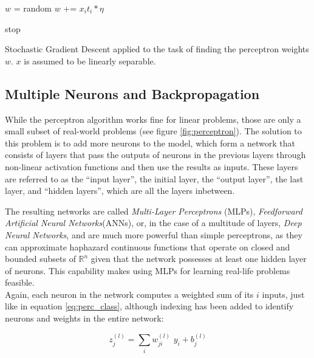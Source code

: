\begin {algorithm}
	\begin {algorithmic}[1]
		\State $w$ = random
					\State $w$ += $x_i t_i * \eta$
				\EndIf

					\State stop
				\EndIf
			\EndFor
		\EndWhile
	\end{algorithmic}
	\caption{Stochastic Gradient Descent applied to the task of finding the perceptron weights $w$. $x$ is assumed to be linearly separable.}
	\label{alg:perceptron_algorithm}
\end{algorithm}



		\subsection{Multiple Neurons and Backpropagation}
While the perceptron algorithm works fine for linear problems, those are only a small subset of real-world problems (see figure \ref{fig:perceptron}). The solution to this problem is to add more neurons to the model, which form a network that consists of layers that pass the outputs of neurons in the previous layers through non-linear activation functions and then use the results as inputs. These layers are referred to as the ``input layer'', the initial layer, the ``output layer'', the last layer, and ``hidden layers'', which are all the layers inbetween.

The resulting networks are called \textit{Multi-Layer Perceptrons} (MLPs), \textit{Feedforward Artificial Neural Networks}(ANNs), or, in the case of a multitude of layers, \textit{Deep Neural Networks}, and are much more powerful than simple perceptrons, as they can approximate haphazard continuous functions that operate on closed and bounded subsets of $\mathbb{R}^n$ given that the network possesses at least one hidden layer of neurons. This capability makes using MLPs for learning real-life problems feasible.\cite{universal_approx}\cite{universal_approx2}\\

\noindent Again, each neuron in the network computes a weighted sum of its $i$ inputs, just like in equation \ref{eq:perc_class}, although indexing has been added to identify neurons and weights in the entire network:

\[ z_j^{(l)} = \sum \limits_{i} w^{(l)}_{ji}\,\, y_i + b^{(l)}_{j} \]

